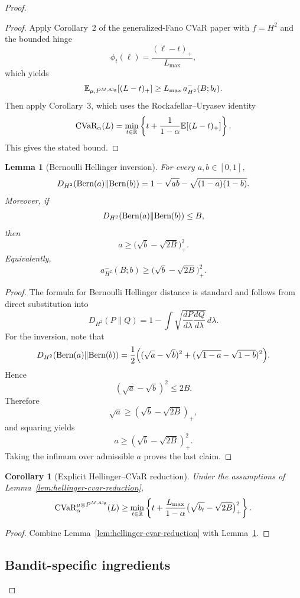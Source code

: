 \documentclass[conference]{IEEEtran}
\newtheorem{corollary}{Corollary}
\newtheorem{lemma}{Lemma}
\begin{document}
\begin{proof}[Proof]
\begin{proof}
Apply Corollary~2 of the generalized-Fano CVaR paper with $f=H^2$ and the bounded hinge
\[
\phi_t(\ell)=\frac{(\ell-t)_+}{L_{\max}},
\]
which yields
\[
\mathbb{E}_{\mu,P^{M,\textup{Alg}}}[(L-t)_+]
\ge
L_{\max}\, a^{-}_{H^2}(B;b_t).
\]
Then apply Corollary~3, which uses the Rockafellar--Uryasev identity
\[
\textup{CVaR}_\alpha(L)=\min_{t\in\mathbb R}\left\{t+\frac{1}{1-\alpha}\mathbb{E}[(L-t)_+]\right\}.
\]
This gives the stated bound. \qedhere
\end{proof}

\begin{lemma}[Bernoulli Hellinger inversion]
\label{lem:bernoulli-hellinger-inversion}
For every $a,b\in[0,1]$,
\[
D_{H^2}(\textup{Bern}(a)\|\textup{Bern}(b))
=
1-\sqrt{ab}-\sqrt{(1-a)(1-b)}.
\]
Moreover, if
\[
D_{H^2}(\textup{Bern}(a)\|\textup{Bern}(b))\le B,
\]
then
\[
a\ge \bigl(\sqrt b-\sqrt{2B}\bigr)_+^2.
\]
Equivalently,
\[
a^{-}_{H^2}(B;b)\ge \bigl(\sqrt b-\sqrt{2B}\bigr)_+^2.
\]
\end{lemma}

\begin{proof}
The formula for Bernoulli Hellinger distance is standard and follows from direct substitution into
\[
D_{H^2}(P\|Q)=1-\int \sqrt{\frac{dP}{d\lambda}\frac{dQ}{d\lambda}}\,d\lambda.
\]
For the inversion, note that
\[
D_{H^2}(\textup{Bern}(a)\|\textup{Bern}(b))
=
\frac12\Bigl(
(\sqrt a-\sqrt b)^2 + (\sqrt{1-a}-\sqrt{1-b})^2
\Bigr).
\]
Hence
\[
(\sqrt a-\sqrt b)^2 \le 2B.
\]
Therefore
\[
\sqrt a \ge (\sqrt b-\sqrt{2B})_+,
\]
and squaring yields
\[
a\ge (\sqrt b-\sqrt{2B})_+^2.
\]
Taking the infimum over admissible $a$ proves the last claim.
\end{proof}

\begin{corollary}[Explicit Hellinger--CVaR reduction]
\label{cor:explicit-hellinger-cvar}
Under the assumptions of Lemma~\ref{lem:hellinger-cvar-reduction},
\[
\textup{CVaR}_\alpha^{\mu\otimes P^{M,\textup{Alg}}}(L)
\ge
\min_{t\in\mathbb R}
\left\{
t+\frac{L_{\max}}{1-\alpha}
\bigl(\sqrt{b_t}-\sqrt{2B}\bigr)_+^2
\right\}.
\]
\end{corollary}

\begin{proof}
Combine Lemma~\ref{lem:hellinger-cvar-reduction} with Lemma~\ref{lem:bernoulli-hellinger-inversion}.
\end{proof}

\subsection{Bandit-specific ingredients}


\end{proof}
\end{document}
